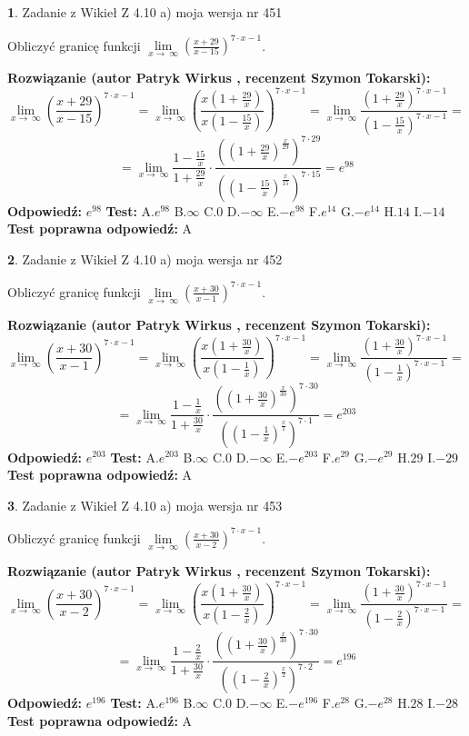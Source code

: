 \documentclass[12pt, a4paper]{article}
\theoremstyle{definition} %
\newtheorem{zad}{}
\newcommand{\zadStart}[1]{\begin{zad}#1\newline}
\newcommand{\zadStop}{\end{zad}}
\newcommand{\rozwStart}[2]{\noindent \textbf{Rozwiązanie (autor #1 , recenzent #2): }\newline}
\newcommand{\rozwStop}{\newline}
\newcommand{\odpStart}{\noindent \textbf{Odpowiedź:}\newline}
\newcommand{\odpStop}{\newline}
\newcommand{\testStart}{\noindent \textbf{Test:}\newline}
\newcommand{\testStop}{\newline}
\newcommand{\kluczStart}{\noindent \textbf{Test poprawna odpowiedź:}\newline}
\newcommand{\kluczStop}{\newline}
\begin{document}
\zadStart{Zadanie z Wikieł Z 4.10 a) moja wersja nr 451}

Obliczyć granicę funkcji  $\lim\limits_{x\to\ \infty}(\frac{x+29}{x-15})^{7\cdot x-1}$.
\zadStop
\rozwStart{Patryk Wirkus}{Szymon Tokarski}
$$\lim\limits_{x\to\ \infty}(\frac{x+29}{x-15})^{7\cdot x-1} = \lim\limits_{x\to\ \infty}(\frac{x(1+\frac{29}{x})}{x(1-\frac{15}{x})})^{7\cdot x-1}=\lim\limits_{x\to\ \infty}\frac{(1+\frac{29}{x})^{7\cdot x-1}}{(1-\frac{15}{x})^{7\cdot x-1}}=$$
$$=\lim\limits_{x\to\ \infty}\frac{1-\frac{15}{x}}{1+\frac{29}{x}}\cdot\frac{((1+\frac{29}{x})^{\frac{x}{29}})^{7\cdot29}}{((1-\frac{15}{x})^{\frac{x}{15}})^{7\cdot15}}=e^{98}$$
\rozwStop
\odpStart
$e^{98}$
\odpStop
\testStart
A.$e^{98}$ B.$\infty$ C.$0$ D.$-\infty$ E.$-e^{98}$
F.$e^{14}$ G.$-e^{14}$
H.$14$
I.$-14$
\testStop
\kluczStart
A
\kluczStop



\zadStart{Zadanie z Wikieł Z 4.10 a) moja wersja nr 452}

Obliczyć granicę funkcji  $\lim\limits_{x\to\ \infty}(\frac{x+30}{x-1})^{7\cdot x-1}$.
\zadStop
\rozwStart{Patryk Wirkus}{Szymon Tokarski}
$$\lim\limits_{x\to\ \infty}(\frac{x+30}{x-1})^{7\cdot x-1} = \lim\limits_{x\to\ \infty}(\frac{x(1+\frac{30}{x})}{x(1-\frac{1}{x})})^{7\cdot x-1}=\lim\limits_{x\to\ \infty}\frac{(1+\frac{30}{x})^{7\cdot x-1}}{(1-\frac{1}{x})^{7\cdot x-1}}=$$
$$=\lim\limits_{x\to\ \infty}\frac{1-\frac{1}{x}}{1+\frac{30}{x}}\cdot\frac{((1+\frac{30}{x})^{\frac{x}{30}})^{7\cdot30}}{((1-\frac{1}{x})^{\frac{x}{1}})^{7\cdot1}}=e^{203}$$
\rozwStop
\odpStart
$e^{203}$
\odpStop
\testStart
A.$e^{203}$ B.$\infty$ C.$0$ D.$-\infty$ E.$-e^{203}$
F.$e^{29}$ G.$-e^{29}$
H.$29$
I.$-29$
\testStop
\kluczStart
A
\kluczStop



\zadStart{Zadanie z Wikieł Z 4.10 a) moja wersja nr 453}

Obliczyć granicę funkcji  $\lim\limits_{x\to\ \infty}(\frac{x+30}{x-2})^{7\cdot x-1}$.
\zadStop
\rozwStart{Patryk Wirkus}{Szymon Tokarski}
$$\lim\limits_{x\to\ \infty}(\frac{x+30}{x-2})^{7\cdot x-1} = \lim\limits_{x\to\ \infty}(\frac{x(1+\frac{30}{x})}{x(1-\frac{2}{x})})^{7\cdot x-1}=\lim\limits_{x\to\ \infty}\frac{(1+\frac{30}{x})^{7\cdot x-1}}{(1-\frac{2}{x})^{7\cdot x-1}}=$$
$$=\lim\limits_{x\to\ \infty}\frac{1-\frac{2}{x}}{1+\frac{30}{x}}\cdot\frac{((1+\frac{30}{x})^{\frac{x}{30}})^{7\cdot30}}{((1-\frac{2}{x})^{\frac{x}{2}})^{7\cdot2}}=e^{196}$$
\rozwStop
\odpStart
$e^{196}$
\odpStop
\testStart
A.$e^{196}$ B.$\infty$ C.$0$ D.$-\infty$ E.$-e^{196}$
F.$e^{28}$ G.$-e^{28}$
H.$28$
I.$-28$
\testStop
\kluczStart
A
\kluczStop
\end{document}
